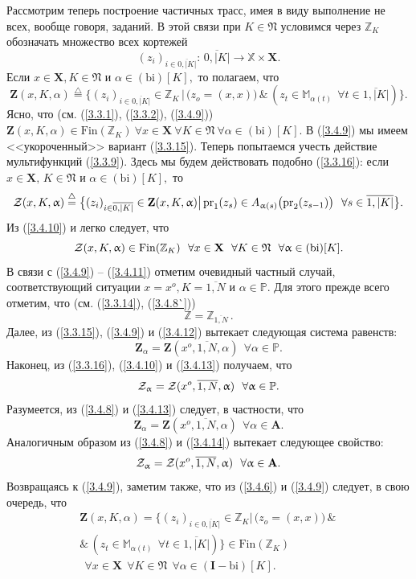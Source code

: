 \documentclass[11pt,twoside,openany]{report}
\newcommand{\bfn}{\begin{equation}}
\newcommand{\efn}{\end{equation}}
\newcommand{\df}{\stackrel{\triangle}{=}}
\newcommand{\ov}{\overline}
\newcommand{\al}{\alpha}
\newcommand{\fa}{\forall}
\newcommand{\cz}{{\cal Z}}
\newcommand{\bbz}{{\mathbb Z}}
\newcommand{\bbm}{{\mathbb M}}
\newcommand{\bbx}{{\mathbb X}}
\newcommand{\bbp}{{\mathbb P}}
\begin{document}
Рассмотрим теперь построение частичных трасс, имея в виду выполнение не всех,
вообще говоря, заданий. В этой связи при $K\in\mathfrak{N}$ условимся через $\bbz_K$
обозначать множество всех кортежей
\bfn\label{3.4.8`}
(z_i)_{i\in \ov{0,|K|}}:\,\ov{0,|K|} \longrightarrow \bbx \times \mathbf{X}.
\efn
Если $x\in \mathbf{X}, K\in \mathfrak{N}$ и $\al\in (\mathrm{bi})[K],$ то
полагаем, что
\bfn\label{3.4.9}
\mathbf{Z}(x,K,\al) \df \{(z_i)_{i\in \ov{0,|K|}}\in \bbz_K\,|\,\bigl(z_o=
(x,x)\bigl)\,\&\,(z_t\in \bbm_{\al(t)}\ \ \fa t\in \ov{1,|K|})\}.
\efn
Ясно, что (см. (\ref{3.3.1}), (\ref{3.3.2}), (\ref{3.4.9})) $\mathbf{Z}(x,K,\al)
\in \mathrm{Fin}(\bbz_K)\  \fa x\in \mathbf{X}\  \fa K\in \mathfrak{N}\  \fa
\al\in (\mathrm{bi})[K].$ В (\ref{3.4.9}) мы имеем <<укороченный>> вариант
(\ref{3.3.15}). Теперь попытаемся учесть действие мультифункций (\ref{3.3.9}).
Здесь мы будем действовать подобно (\ref{3.3.16}): если $x\in \mathbf{X},\, K\in
\mathfrak{N}$ и $\al\in (\mathrm{bi})[K],$ то
\bfn\label{3.4.10}\cz(x,K,\al) \df \bigl\{(z_i)_{i\in\ov{0,|K|}}\in \mathbf{Z}
(x,K,\al) \bigl|\,\mathrm{pr}_1(z_s)\in A_{\al(s)}\bigl(\mathrm{pr}_2(z_{s-1})
\bigl)\ \ \fa s\in \ov{1,|K|}\bigl\}.
\efn
Из (\ref{3.4.10}) и \cite[(3.21)]{Cha3`} легко следует, что
\bfn\label{3.4.11}\cz(x,K,\al) \in \mathrm{Fin}(\bbz_K)\ \ \fa x\in
\mathbf{X}\ \ \fa K\in \mathfrak{N}\ \ \fa \al\in (\mathrm{bi})[K].
\efn
В связи с (\ref{3.4.9}) -- (\ref{3.4.11}) отметим очевидный частный случай,
соответствующий ситуации $x = x^o, K = \ov{1,N}$ и $\al\in \bbp.$ Для этого
прежде всего отметим, что (см. (\ref{3.3.14}), (\ref{3.4.8`}))
\bfn\label{3.4.12}\bbz = \bbz_{\ov{1,N}}\,.
\efn
Далее, из (\ref{3.3.15}), (\ref{3.4.9}) и (\ref{3.4.12}) вытекает следующая
система равенств:
\bfn\label{3.4.13}
\mathbf{Z}_\al = \mathbf{Z}(x^o,\ov{1,N},\al) \ \ \fa \al\in \bbp.
\efn
Наконец, из (\ref{3.3.16}), (\ref{3.4.10}) и (\ref{3.4.13})  получаем, что
\bfn\label{3.4.14}\cz_\al = \cz(x^o,\ov{1,N},\al) \ \ \fa \al\in \bbp.
\efn
Разумеется, из (\ref{3.4.8}) и (\ref{3.4.13}) следует, в частности, что
\bfn\label{3.4.15}
\mathbf{Z}_\al = \mathbf{Z}(x^o,\ov{1,N},\al) \ \ \fa \al\in \mathbf{A}.
\efn
Аналогичным образом из (\ref{3.4.8}) и (\ref{3.4.14}) вытекает следующее
свойство:
\bfn\label{3.4.16}\cz_\al = \cz(x^o,\ov{1,N},\al) \ \ \fa \al\in \mathbf{A}.
\efn
Возвращаясь к (\ref{3.4.9}), заметим также, что из (\ref{3.4.6}) и (\ref{3.4.9})
следует, в свою очередь, что
\begin{eqnarray}
&\mathbf{Z}(x,K,\al) = \bigl\{(z_i)_{i\in \ov{0,|K|}} \in \bbz_K\bigl|\,\bigl(z_o =
(x,x)\bigl)\,\&\,
&\nonumber\\
&\&\,(z_t\in \bbm_{\al(t)}\ \ \fa t\in \ov{1,|K|})\bigl\}\in \mathrm{Fin}
(\bbz_K)
&\nonumber\\
&\ \ \fa x\in \mathbf{X}\ \ \fa K\in \mathfrak{N}\ \ \fa \al\in (\mathbf{I}-\mathrm{bi})[K].
&\label{3.4.17}
\end{eqnarray}
\end{document}
